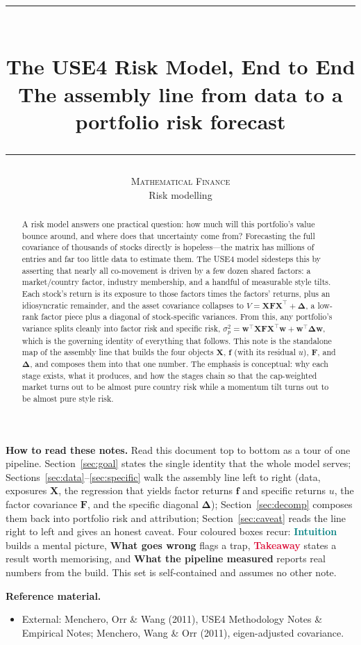 \documentclass[11pt]{article}
\title{\vspace{-2.2em}
  {\color{steel}\rule{\textwidth}{1.3pt}}\\[0.7em]
  \Huge\bfseries The USE4 Risk Model, End to End\\[0.35em]
  \large\mdseries The assembly line from data to a portfolio risk forecast\\[0.4em]
  {\color{steel}\rule{\textwidth}{0.7pt}}}
\author{\textsc{Mathematical Finance}\\[0.2em]
  \small Risk modelling}
\date{}
\theoremstyle{definition}
\theoremstyle{plain}
\theoremstyle{remark}
\newcommand{\T}{^{\!\top}}
\newcommand{\wvec}{\mathbf{w}}
\newcommand{\Xmat}{\mathbf{X}}
\newcommand{\Fmat}{\mathbf{F}}
\newcommand{\Del}{\boldsymbol{\Delta}}
\newcommand{\fvec}{\mathbf{f}}
\begin{document}
\maketitle
\thispagestyle{empty}

\begin{abstract}
A risk model answers one practical question: how much will this portfolio's value bounce around, and where does that uncertainty come from? Forecasting the full covariance of thousands of stocks directly is hopeless---the matrix has millions of entries and far too little data to estimate them. The USE4 model sidesteps this by asserting that nearly all co-movement is driven by a few dozen shared factors: a market/country factor, industry membership, and a handful of measurable style tilts. Each stock's return is its exposure to those factors times the factors' returns, plus an idiosyncratic remainder, and the asset covariance collapses to $V = \Xmat\Fmat\Xmat\T + \Del$, a low-rank factor piece plus a diagonal of stock-specific variances. From this, any portfolio's variance splits cleanly into factor risk and specific risk, $\sigma_p^2 = \wvec\T\Xmat\Fmat\Xmat\T\wvec + \wvec\T\Del\wvec$, which is the governing identity of everything that follows. This note is the standalone map of the assembly line that builds the four objects $\Xmat$, $\fvec$ (with its residual $u$), $\Fmat$, and $\Del$, and composes them into that one number. The emphasis is conceptual: why each stage exists, what it produces, and how the stages chain so that the cap-weighted market turns out to be almost pure country risk while a momentum tilt turns out to be almost pure style risk.
\end{abstract}

\begin{tcolorbox}[colback=paperlt,colframe=ink!30,boxrule=0.4pt,arc=2pt,left=10pt,right=10pt,top=8pt,bottom=8pt]
\textbf{How to read these notes.} Read this document top to bottom as a tour of one pipeline. Section~\ref{sec:goal} states the single identity that the whole model serves; Sections~\ref{sec:data}--\ref{sec:specific} walk the assembly line left to right (data, exposures $\Xmat$, the regression that yields factor returns $\fvec$ and specific returns $u$, the factor covariance $\Fmat$, and the specific diagonal $\Del$); Section~\ref{sec:decomp} composes them back into portfolio risk and attribution; Section~\ref{sec:caveat} reads the line right to left and gives an honest caveat. Four coloured boxes recur: \textcolor{teal}{\textbf{Intuition}} builds a mental picture, \textcolor{amber}{\textbf{What goes wrong}} flags a trap, \textcolor{crimson}{\textbf{Takeaway}} states a result worth memorising, and \textcolor{steel}{\textbf{What the pipeline measured}} reports real numbers from the build. This set is self-contained and assumes no other note.

\smallskip
\textbf{Reference material.}
\begin{itemize}[leftmargin=1.4em,nosep]
  \item External: Menchero, Orr \& Wang (2011), USE4 Methodology Notes \& Empirical Notes; Menchero, Wang \& Orr (2011), eigen-adjusted covariance.
\end{itemize}
\end{tcolorbox}
\end{document}
